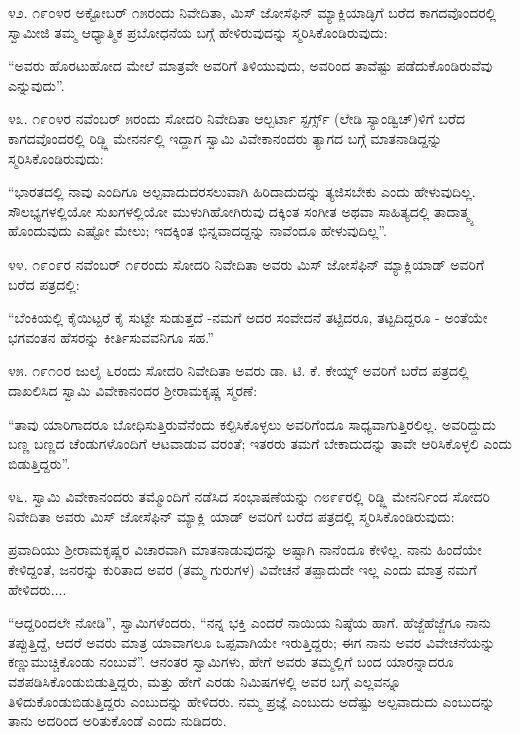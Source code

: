 ೪೨. ೧೯೦೪ರ ಅಕ್ಟೋಬರ್ ೧೫ರಂದು ನಿವೇದಿತಾ, ಮಿಸ್ ಜೋಸೆಫಿನ್ ಮ್ಯಾಕ್ಲಿಯಾಡ್ಳಿಗೆ ಬರೆದ ಕಾಗದವೊಂದರಲ್ಲಿ ಸ್ವಾಮೀಜಿ ತಮ್ಮ ಆಧ್ಯಾತ್ಮಿಕ ಪ್ರಬೋಧನೆಯ ಬಗ್ಗೆ ಹೇಳಿರುವುದನ್ನು ಸ್ಮರಿಸಿಕೊಂಡಿರುವುದು:

“ಅವರು ಹೊರಟುಹೋದ ಮೇಲೆ ಮಾತ್ರವೇ ಅವರಿಗೆ ತಿಳಿಯುವುದು, ಅವರಿಂದ ತಾವೆಷ್ಟು ಪಡೆದುಕೊಂಡಿರುವೆವು ಎನ್ನುವುದು”. 

೪೩. ೧೯೦೪ರ ನವೆಂಬರ್ ೫ರಂದು ಸೋದರಿ ನಿವೇದಿತಾ ಆಲ್ಬರ್ಟಾ ಸ್ಟರ್ಗ್ಸ್ (ಲೇಡಿ ಸ್ಯಾಂಡ್ವಿಚ್)ಳಿಗೆ ಬರೆದ ಕಾಗದವೊಂದರಲ್ಲಿ ರಿಡ್ಜ್ಲಿ ಮೇನರ್ನಲ್ಲಿ ಇದ್ದಾಗ ಸ್ವಾಮಿ ವಿವೇಕಾನಂದರು ತ್ಯಾಗದ ಬಗ್ಗೆ ಮಾತನಾಡಿದ್ದನ್ನು ಸ್ಮರಿಸಿಕೊಂಡಿರುವುದು:

“ಭಾರತದಲ್ಲಿ ನಾವು ಎಂದಿಗೂ ಅಲ್ಪವಾದುದರಸಲುವಾಗಿ ಹಿರಿದಾದುದನ್ನು ತ್ಯಜಿಸಬೇಕು ಎಂದು ಹೇಳುವುದಿಲ್ಲ. ಸೌಲಭ್ಯಗಳಲ್ಲಿಯೋ ಸುಖಗಳಲ್ಲಿಯೋ ಮುಳುಗಿಹೋಗಿರುವು ದಕ್ಕಿಂತ ಸಂಗೀತ ಅಥವಾ ಸಾಹಿತ್ಯದಲ್ಲಿ ತಾದಾತ್ಮ್ಯ ಹೊಂದುವುದು ಎಷ್ಟೋ ಮೇಲು; ಇದಕ್ಕಿಂತ ಭಿನ್ನವಾದದ್ದನ್ನು ನಾವೆಂದೂ ಹೇಳುವುದಿಲ್ಲ”. 

೪೪. ೧೯೦೯ರ ನವೆಂಬರ್ ೧೯ರಂದು ಸೋದರಿ ನಿವೇದಿತಾ ಅವರು ಮಿಸ್ ಜೋಸೆಫಿನ್ ಮ್ಯಾಕ್ಲಿಯಾಡ್ ಅವರಿಗೆ ಬರೆದ ಪತ್ರದಲ್ಲಿ:

“ಬೆಂಕಿಯಲ್ಲಿ ಕೈಯಿಟ್ಟರೆ ಕೈ ಸುಟ್ಟೇ ಸುಡುತ್ತದೆ -ನಮಗೆ ಅದರ ಸಂವೇದನೆ ತಟ್ಟಿದರೂ, ತಟ್ಟದಿದ್ದರೂ - ಅಂತೆಯೇ ಭಗವಂತನ ಹೆಸರನ್ನು ಕೀರ್ತಿಸುವವನಿಗೂ ಸಹ.” 

೪೫. ೧೯೧೦ರ ಜುಲೈ ೬ರಂದು ಸೋದರಿ ನಿವೇದಿತಾ ಅವರು ಡಾ. ಟಿ. ಕೆ. ಕೇಯ್ನ್ ಅವರಿಗೆ ಬರೆದ ಪತ್ರದಲ್ಲಿ ದಾಖಲಿಸಿದ ಸ್ವಾಮಿ ವಿವೇಕಾನಂದರ ಶ‍್ರೀರಾಮಕೃಷ್ಣ ಸ್ಮರಣೆ:

“ತಾವು ಯಾರಿಗಾದರೂ ಬೋಧಿಸುತ್ತಿರುವೆನೆಂದು ಕಲ್ಪಿಸಿಕೊಳ್ಳಲು ಅವರಿಗೆಂದೂ ಸಾಧ್ಯವಾಗುತ್ತಿರಲಿಲ್ಲ. ಅವರಿದ್ದುದು ಬಣ್ಣ ಬಣ್ಣದ ಚೆಂಡುಗಳೊಂದಿಗೆ ಆಟವಾಡುವ ವರಂತೆ; ಇತರರು ತಮಗೆ ಬೇಕಾದುದನ್ನು ತಾವೇ ಆರಿಸಿಕೊಳ್ಳಲಿ ಎಂದು ಬಿಡುತ್ತಿದ್ದರು”. 

೪೬. ಸ್ವಾಮಿ ವಿವೇಕಾನಂದರು ತಮ್ಮೊಂದಿಗೆ ನಡೆಸಿದ ಸಂಭಾಷಣೆಯನ್ನು ೧೮೯೯ರಲ್ಲಿ ರಿಡ್ಜ್ಲಿ ಮೇನರ್ನಿಂದ ಸೋದರಿ ನಿವೇದಿತಾ ಅವರು ಮಿಸ್ ಜೋಸೆಫಿನ್ ಮ್ಯಾಕ್ಲಿ ಯಾಡ್ ಅವರಿಗೆ ಬರೆದ ಪತ್ರದಲ್ಲಿ ಸ್ಮರಿಸಿಕೊಂಡಿರುವುದು:

ಪ್ರವಾದಿಯು ಶ‍್ರೀರಾಮಕೃಷ್ಣರ ವಿಚಾರವಾಗಿ ಮಾತನಾಡುವುದನ್ನು ಅಷ್ಟಾಗಿ ನಾನೆಂದೂ ಕೇಳಿಲ್ಲ. ನಾನು ಹಿಂದೆಯೇ ಕೇಳಿದ್ದಂತೆ, ಜನರನ್ನು ಕುರಿತಾದ ಅವರ (ತಮ್ಮ ಗುರುಗಳ) ವಿವೇಚನೆ ತಪ್ಪಾದುದೇ ಇಲ್ಲ ಎಂದು ಮಾತ್ರ ನಮಗೆ ಹೇಳಿದರು....

“ಆದ್ದರಿಂದಲೇ ನೋಡಿ”, ಸ್ವಾಮಿಗಳೆಂದರು, “ನನ್ನ ಭಕ್ತಿ ಎಂದರೆ ನಾಯಿಯ ನಿಷ್ಠೆಯ ಹಾಗೆ. ಹೆಜ್ಜೆಹೆಜ್ಜೆಗೂ ನಾನು ತಪ್ಪುತ್ತಿದ್ದೆ, ಆದರೆ ಅವರು ಮಾತ್ರ ಯಾವಾಗಲೂ ಒಪ್ಪವಾಗಿಯೇ ಇರುತ್ತಿದ್ದರು; ಈಗ ನಾನು ಅವರ ವಿವೇಚನೆಯನ್ನು ಕಣ್ಣುಮುಚ್ಚಿಕೊಂಡು ನಂಬುವೆ”. ಆನಂತರ ಸ್ವಾಮಿಗಳು, ಹೇಗೆ ಅವರು ತಮ್ಮಲ್ಲಿಗೆ ಬಂದ ಯಾರನ್ನಾದರೂ ವಶಪಡಿಸಿಕೊಂಡುಬಿಡುತ್ತಿದ್ದರು, ಮತ್ತು ಹೇಗೆ ಎರಡು ನಿಮಿಷಗಳಲ್ಲಿ ಅವರ ಬಗ್ಗೆ ಎಲ್ಲವನ್ನೂ ತಿಳಿದುಕೊಂಡುಬಿಡುತ್ತಿದ್ದರು ಎಂಬುದನ್ನು ಹೇಳಿದರು. ನಮ್ಮ ಪ್ರಜ್ಞೆ ಎಂಬುದು ಅದೆಷ್ಟು ಅಲ್ಪವಾದುದು ಎಂಬುದನ್ನು ತಾನು ಅದರಿಂದ ಅರಿತುಕೊಂಡೆ ಎಂದು ನುಡಿದರು. 


